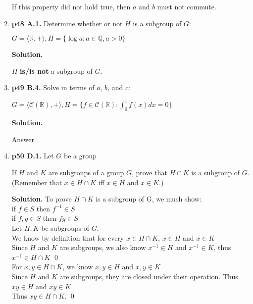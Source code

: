 \documentclass[11pt]{article}
\begin{document}
\begin{enumerate}
  If this property did not hold true, then $a$ and $b$ must not commute. \\
  
\newpage
 
\item {\bfseries p48 A.1.} Determine whether or not $H$ is a subgroup of $G$:
  
  $G = \langle \mathbb{R},+\rangle, H = \{\log a : a \in \mathbb{Q}, a>0\}$
  
  {\bfseries Solution.}
  
  $H$ {\bfseries is/is not} a subgroup of $G$. \\

\item {\bfseries p49 B.4.}
  Solve in terms of $a$, $b$, and $c$:
  
  $G = \langle \mathscr{C}(\mathbb{R}),+\rangle, H = \{f \in \mathscr{C}(\mathbb{R}) : \int_{0}^{1} f(x) dx = 0\}$
  
  {\bfseries Solution.}
  
  Answer \\
 
\newpage
 
\item {\bfseries p50 D.1.} Let $G$ be a group
  
  If $H$ and $K$ are subgroups of a group $G$, prove that $H \cap K$ is a subgroup of $G$. (Remember that $x \in H \cap K$ iff $x \in H$ and $x \in K$.)
  
  {\bfseries Solution.} To prove $H \cap K$ is a subgroup of G, we mush show: \\
  if $f \in S$ then $f^{-1} \in S$ \\
  if $f,g \in S$ then $fg \in S$ \\
  
  Let $H, K$ be subgroups of $G$. \\
  We know by definition that for every $x \in H \cap K$, $x \in H$ and $x \in K$ \\
  Since $H$ and $K$ are subgroups, we also know $x^{-1} \in H$ and $x^{-1} \in K$, thus $x^{-1} \in H \cap K$ \qed \\
  
  For $x,y \in H \cap K$, we know $x,y \in H$ and $x,y \in K$ \\
  Since $H$ and $K$ are subgroups, they are closed under their operation. Thus $xy \in H$ and $xy \in K$ \\
  Thus $xy \in H \cap K$. \qed \\
  

\end{enumerate}
\end{document}

